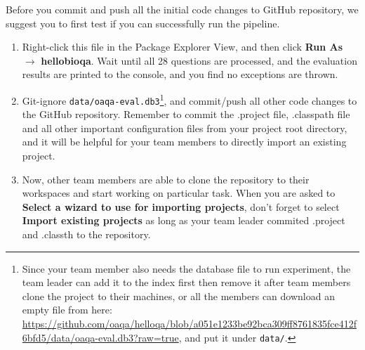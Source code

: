 Before you commit and push all the initial code changes to GitHub repository, we
suggest you to first test if you can successfully run the pipeline.

\begin{enumerate}

\item Right-click this file in the Package Explorer View, and then click
\textbf{Run As} $\rightarrow$ \textbf{hellobioqa}. Wait until all 28 questions
are processed, and the evaluation results are printed to the console, and you
find no exceptions are thrown.

\item Git-ignore \texttt{data/oaqa-eval.db3}\footnote{Since your team member
also needs the database file to run experiment, the team leader can add it to
the index first then remove it after team members clone the project to their
machines, or all the members can download an empty file from here:
\url{https://github.com/oaqa/helloqa/blob/a051e1233be92bca309ff8761835fce412f6bfd5/data/oaqa-eval.db3?raw=true},
and put it under \texttt{data/}.}, and commit/push all other code changes to the
GitHub repository. Remember to commit the .project file, .classpath file and all
other important configuration files from your project root directory, and it
will be helpful for your team members to directly import an existing project.

\item Now, other team members are able to clone the repository to their
workspaces and start working on particular task. When you are asked to
\textbf{Select a wizard to use for importing projects}, don't forget to select
\textbf{Import existing projects} as long as your team leader commited .project
and .classth to the repository.

\end{enumerate}
